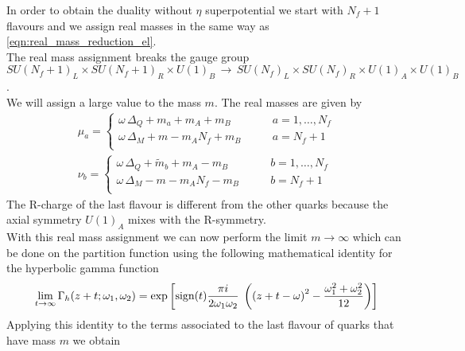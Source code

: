 In order to obtain the duality without $\eta$ superpotential we start with $N_f + 1 $ flavours and we assign real masses in the same way as \eqref{eqn:real_mass_reduction_el}. \\
The real mass assignment breaks the gauge group $ SU(N_f+1)_L \times SU(N_f+1)_R \times U(1)_B \, \rightarrow \, SU(N_f)_L \times SU(N_f)_R \times U(1)_A \times U(1)_B$. \\
We will assign a large value to the mass $m$. 
The real masses are given by
\begin{equation}
\begin{aligned}
\mu_a = 
	\begin{cases}
		\omega \, \Delta_Q + m_a + m_A + m_B \qquad  &a = 1, \dotsc, N_f\\ 
		\omega \, \Delta_M +  m - m_A N_f  + m_B \qquad  &a = N_f+1\\ 
	\end{cases}
	\\
\nu_b = 
	\begin{cases}
		\omega \, \Delta_Q + \tilde{m}_b + m_A - m_B \qquad  &b = 1, \dotsc, N_f\\ 
		\omega \, \Delta_M - m - m_A N_f  - m_B \qquad  &b = N_f+1\\ 
	\end{cases}
\end{aligned}
\label{eqn:electric_theory_real_masses}
\end{equation}
The R-charge of the last flavour is different from the other quarks because the axial symmetry $U(1)_A$ mixes with the R-symmetry.\\
With this real mass assignment we can now perform the limit $m \rightarrow \infty$ which can be done on the partition function using the following mathematical identity for the hyperbolic gamma function \cite{vanDeBult:2007}
\begin{equation}
 \lim_{ t \rightarrow \infty } \Gamma_h ( z + t; \omega_1, \omega_2) = 
\exp \left[ 
 \hbox{sign}(t) \frac{\pi i}{2 \omega_1 \omega_2}\; 
	\left(
		\left(
			z +t - \omega
		\right)^2 - \frac{\omega_1^2 + \omega_2^2}{12}
	\right)
\right]
\label{eqn:m_infinity_limit_hyperbolic}
\end{equation}
Applying this identity to the terms associated to the last flavour of quarks that have mass $m$ we obtain
